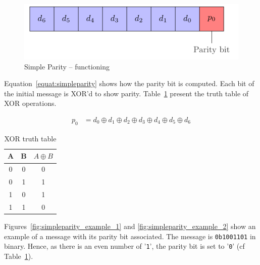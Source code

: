 \begin{figure}[ht]
    \centering
    \includegraphics[page=1]{c5_countermeasures_dift/img/simple_parity.pdf}
    \caption{Simple Parity -- functioning}
    \label{fig:simpleparity_functionning}
\end{figure}

Equation~\ref{equat:simpleparity} shows how the parity bit is computed. Each bit of the initial message is XOR'd to show parity. Table~\ref{tab:xor_truthtable} present the truth table of XOR operations.

\begin{equation} \label{equat:simpleparity}
    \begin{split}
        p_{0} &= d_{0} \oplus d_{1} \oplus d_{2} \oplus d_{3} \oplus d_{4} \oplus d_{5} \oplus d_{6}
    \end{split}
\end{equation}

\begin{table}[t]
    \centering
    \footnotesize
    \caption{XOR truth table}
    \label{tab:xor_truthtable}
    \begin{tabular}{@{}c|c|c@{}}
        \toprule
        A & B & $A \oplus B$ \\\midrule
        0 & 0 & 0            \\
        0 & 1 & 1            \\
        1 & 0 & 1            \\
        1 & 1 & 0            \\
        \bottomrule
    \end{tabular}
\end{table}

Figures~\ref{fig:simpleparity_example_1} and \ref{fig:simpleparity_example_2} show an example of a message with its parity bit associated. The message is \texttt{0b1001101} in binary. Hence, as there is an even number of '\texttt{1}', the parity bit is set to '\texttt{0}' (cf Table~\ref{tab:xor_truthtable}).

